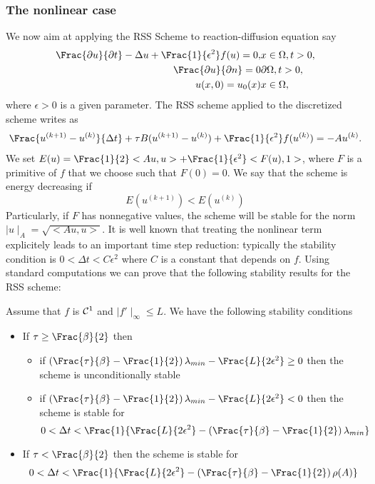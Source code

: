 {\subsubsection{The nonlinear case}
We now aim at applying the RSS Scheme to reaction-diffusion equation say
\begin{eqnarray}
\Frac{\partial u}{\partial t} -\Delta u +\Frac{1}{\epsilon^2}f(u)=0, & x\in \Omega, t>0,\\
\Frac{\partial u}{\partial n}= 0 & \partial \Omega , t>0,\\
u(x,0)=u_0(x) & x\in \Omega ,
\end{eqnarray}
 where $\epsilon >0$ is a given parameter. The RSS scheme applied to the discretized scheme writes as
\begin{eqnarray}
 \Frac{u^{(k+1)}-u^{(k)}}{\Delta t} +\tau B (u^{(k+1)}-u^{(k)}) +\Frac{1}{\epsilon^2}f(u^{(k)}) =-Au^{(k)}.
 \label{RSSAC}
 \end{eqnarray}
 We set $E(u)=\Frac{1}{2}<Au,u>+\Frac{1}{\epsilon^2}<F(u),1>$, where $F$ is a primitive of $f$ that we choose such that $F(0)=0$. We say that the scheme is energy decreasing if
 $$
 E(u^{(k+1)}) < E(u^{(k)})
 $$
Particularly,  if $F$ has nonnegative values, the scheme will be stable for the norm 
$\mid u \mid_A=\sqrt{<Au,u>}$. It is well known that treating the nonlinear term explicitely leads to an important time step reduction: typically the stability condition is 
$0<\Delta t < C \epsilon^2$ where $C$ is a constant that depends on $f$. Using standard computations
 we can prove that the following stability results for the RSS scheme: 
\begin{theorem_amiens}
Assume that $f$ is ${\cal C}^1$ and $\mid f'\mid_{\infty}\le L$. We have the following stability conditions
\begin{itemize}
\item If $\tau\ge \Frac{\beta}{2}$ then
\begin{itemize}
\item if $\left(\Frac{\tau}{\beta}-\Frac{1}{2}\right)\lambda_{min} -\Frac{L}{2\epsilon^2}\ge 0$ then the scheme is unconditionally stable
\item if $\left(\Frac{\tau}{\beta}-\Frac{1}{2}\right)\lambda_{min} -\Frac{L}{2\epsilon^2}< 0$ then the scheme is stable for
$$
0<\Delta t <\Frac{1}{\Frac{L}{2\epsilon^2} -\left(\Frac{\tau}{\beta}-\Frac{1}{2}\right)\lambda_{min}}
$$
\end{itemize}
\item If $\tau < \Frac{\beta}{2}$ then the scheme is stable for
$$
0<\Delta t <\Frac{1}{\Frac{L}{2\epsilon^2} -\left(\Frac{\tau}{\beta}-\Frac{1}{2}\right)\rho(A)}
$$
\end{itemize}
\end{theorem_amiens}}
